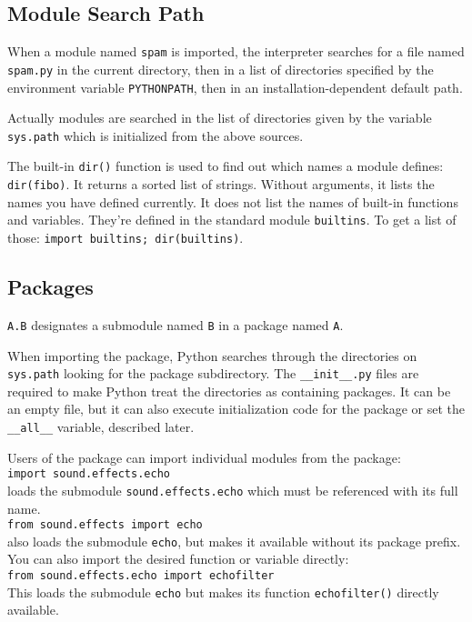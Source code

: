 \subsection{Module Search Path}

When a module named \verb=spam= is imported,
the interpreter searches for a file named \verb=spam.py=
in the current directory, then in a list of directories
specified by the environment variable \verb=PYTHONPATH=,
then in an installation-dependent default path.

Actually modules are searched in the list of directories given by the variable
\verb=sys.path= which is initialized from the above sources.

The built-in \verb=dir()= function is used to find out
which names a module defines: \verb=dir(fibo)=.
It returns a sorted list of strings.
Without arguments, it lists the names you have defined currently.
It does not list the names of built-in functions and variables.
They're defined in the standard module \verb=builtins=.
To get a list of those: \verb=import builtins; dir(builtins)=.

\subsection{Packages}

\verb=A.B= designates a submodule named \verb=B= in a package named \verb=A=.

When importing the package,
Python searches through the directories on \verb=sys.path=
looking for the package subdirectory.
The \verb=__init__.py= files are required
to make Python treat the directories as containing packages.
It can be an empty file,
but it can also execute initialization code for the package
or set the \verb=__all__= variable, described later.

Users of the package can import individual modules from the package:\\
\verb=import sound.effects.echo=\\
loads the submodule \verb=sound.effects.echo=
which must be referenced with its full name.\\
\verb=from sound.effects import echo=\\
also loads the submodule \verb=echo=,
but makes it available without its package prefix.\\
You can also import the desired function or variable directly:\\
\verb=from sound.effects.echo import echofilter=\\
This loads the submodule \verb=echo=
but makes its function \verb=echofilter()= directly available.

